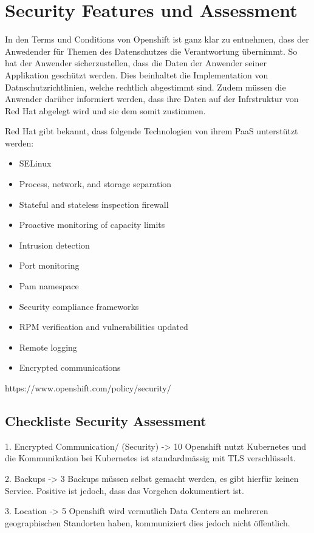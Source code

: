 \documentclass[12pt,a4paper]{article}
\begin{document}
\section{Security Features und Assessment}

In den Terms und Conditions von Openshift ist ganz klar zu entnehmen, dass der Anwedender für Themen des Datenschutzes die Verantwortung übernimmt.
So hat der Anwender sicherzustellen, dass die Daten der Anwender seiner Applikation geschützt werden. Dies beinhaltet die Implementation von
Datnschutzrichtlinien, welche rechtlich abgestimmt sind. Zudem müssen die Anwender darüber informiert werden, dass ihre Daten auf der Infrstruktur
von Red Hat abgelegt wird und sie dem somit zustimmen.

Red Hat gibt bekannt, dass folgende Technologien von ihrem PaaS unterstützt werden:

\begin{itemize}
    \item SELinux
    \item Process, network, and storage separation
    \item Stateful and stateless inspection firewall
    \item Proactive monitoring of capacity limits
    \item Intrusion detection
    \item Port monitoring
    \item Pam namespace
    \item Security compliance frameworks
    \item RPM verification and vulnerabilities updated
    \item Remote logging
    \item Encrypted communications
\end{itemize}
https://www.openshift.com/policy/security/

\subsection{Checkliste Security Assessment}
1. Encrypted Communication/ (Security) -> 10
Openshift nutzt Kubernetes und die Kommunikation bei Kubernetes ist standardmässig mit TLS verschlüsselt.


2. Backups -> 3
Backups müssen selbst gemacht werden, es gibt hierfür keinen Service. Positive ist jedoch, dass das Vorgehen dokumentiert ist.


3. Location -> 5
Openshift wird vermutlich Data Centers an mehreren geographischen Standorten haben, kommuniziert dies jedoch nicht öffentlich.
\end{document}
